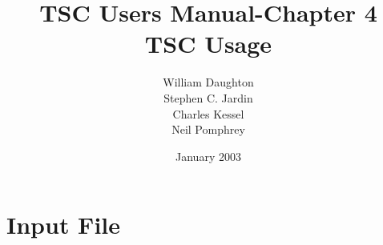 \newlength{\wspace}
\newlength{\width}
\newcommand{\setw}[1]{ \setlength{\width}{\textwidth} \settowidth{\wspace}{#1}
\addtolength{\width}{-\wspace}}
\makeindex
\author{William Daughton \\  Stephen C. Jardin \\  Charles Kessel \\  Neil Pomphrey}
\title{TSC Users Manual-Chapter 4 \\ TSC Usage}
\date{January 2003}

 \setcounter{chapter}{3}
\chapter{Input File}
